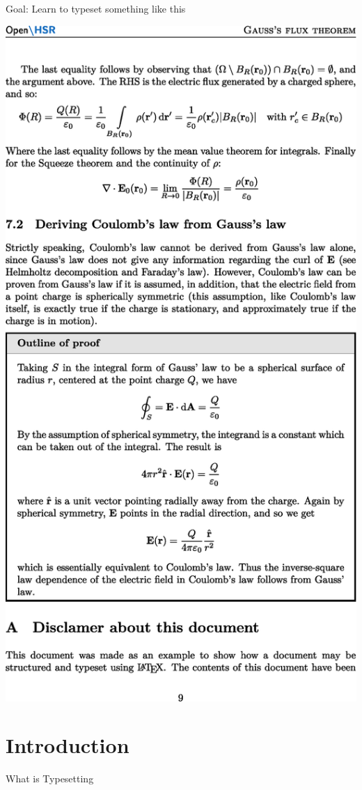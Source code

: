\documentclass[xetex, onlymath]{beamer}
\begin{document}
\begin{frame}{Goal: Learn to typeset something like this}
	\begin{center}
		\vspace{1cm}
		\includegraphics[width=.8\linewidth]{figs/gauss-flux}
	\end{center}
\end{frame}

\section{Introduction}

\begin{frame}{What is Typesetting}
\end{frame}
\end{document}
